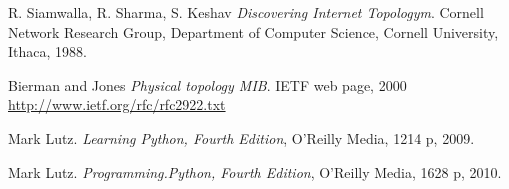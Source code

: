 \begin{thebibliography}{9}
  
  R. Siamwalla, R. Sharma, S. Keshav
  \emph{Discovering Internet Topologym}.
   Cornell Network Research Group, Department of Computer Science, Cornell University, Ithaca, 1988.

      

Bierman and Jones 
\emph{Physical topology MIB}.
IETF web page, 2000
 \url{http://www.ietf.org/rfc/rfc2922.txt} 
 

  Mark Lutz.
  \emph{Learning Python, Fourth Edition},
  O'Reilly Media, 1214 p, 2009.
  
  Mark Lutz.
  \emph{Programming.Python, Fourth Edition},
  O'Reilly Media, 1628 p, 2010.


   
  


  
  

  

\end{thebibliography}
